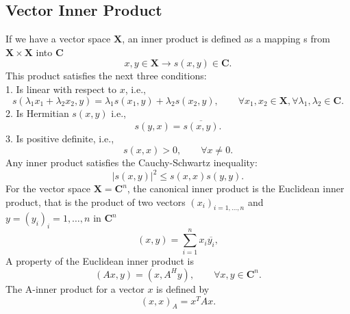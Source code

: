 \documentclass[a4paper,10pt]{report}
\begin{document}
\subsection{Vector Inner Product}
If we have a vector space $\mathbf{X}$, an inner product is defined as a mapping s from $\mathbf{X}  \times \mathbf{X}$ into $\mathbf{C}$
\begin{equation}
 x, y \in \mathbf{X} \rightarrow{} s(x,y) \in \mathbf{C}.
\end{equation}
This product satisfies the next three conditions:\\
1. Is linear with respect to $x$, i.e.,
\begin{equation*}
 s( \lambda_1 x_1+ \lambda_2 x_2,y)= \lambda _1 s(x_1,y)+ \lambda_2 s(x_2,y), \qquad \forall x_1,x_2 \in \mathbf{X}, \forall \lambda_1, \lambda_2 \in \mathbf{C}.
\end{equation*}
2. Is Hermitian $s(x,y)$ i.e.,
\begin{equation*}
 s(y,x)= \overline{s(x,y)}.
\end{equation*}
3. Is positive definite, i.e.,
\begin{equation*}
 s(x,x)>0, \qquad \forall x \neq 0.
\end{equation*}
Any inner product satisfies the Cauchy-Schwartz inequality:
\begin{equation*}
|s(x,y)|^2 \leq s(x,x)s(y,y).
\end{equation*}
For the vector space $\mathbf{X}= \mathbf{C}^n$, the canonical inner product is the
Euclidean inner product, that is the product of two vectors $(x_i)_{i=1,\dots ,n}$ and $y=(y_i)_i=1,\dots,n$ in $\mathbf{C}^n$
\begin{equation*}
 (x,y)=\sum_{i=1}^n x_i\overline{y_i},
\end{equation*}
A property of the Euclidean inner product is
\begin{equation*}
 (Ax,y)=(x,A^Hy), \qquad \forall x,y \in \mathbf{C}^n.
\end{equation*}
The A-inner product for a vector $x$ is defined by
\begin{equation} \label{Aip}
 (x,x)_A=x^TAx. 
\end{equation}
\end{document}
